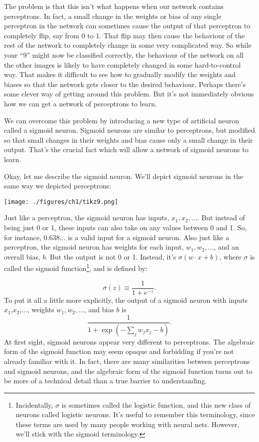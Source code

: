 \documentclass[a4paper,twoside,10pt]{book}
\begin{document}
The problem is that this isn't what happens when our network contains perceptrons. In fact, a small change in the weights or bias of any single perceptron in the network can sometimes cause the output of that perceptron to completely flip, say from 0 to 1. That flip may then cause the behaviour of the rest of the network to completely change in some very complicated way. So while your ``9'' might now be classified correctly, the behaviour of the network on all the other images is likely to have completely changed in some hard-to-control way. That makes it difficult to see how to gradually modify the weights and biases so that the network gets closer to the desired behaviour. Perhaps there's some clever way of getting around this problem. But it's not immediately obvious how we can get a network of perceptrons to learn.

We can overcome this problem by introducing a new type of artificial neuron called a sigmoid neuron. Sigmoid neurons are similar to perceptrons, but modified so that small changes in their weights and bias cause only a small change in their output. That's the crucial fact which will allow a network of sigmoid neurons to learn.

Okay, let me describe the sigmoid neuron. We'll depict sigmoid neurons in the same way we depicted perceptrons:
\begin{center}
	\texttt{[image: ./figures/ch1/tikz9.png]}
\end{center}	
Just like a perceptron, the sigmoid neuron has inputs, $x_1, x_2, \ldots$. But instead of being just 0 or 1, these inputs can also take on any values between 0 and 1. So, for instance, $0.638\ldots$ is a valid input for a sigmoid neuron. Also just like a perceptron, the sigmoid neuron has weights for each input, $w_1,w_2,\ldots$, and an overall bias, $b$. But the output is not 0 or 1. Instead, it's $\sigma(w  \cdot x+b)$, where $\sigma$ is called the sigmoid function\footnote{Incidentally, $\sigma$ is sometimes called the logistic function, and this new class of neurons called logistic neurons. It's useful to remember this terminology, since these terms are used by many people working with neural nets. However, we'll stick with the sigmoid terminology.}, and is defined by:

\begin{equation}
\sigma(z) \equiv \frac1{1+e^{-z}}.\tag{3}\label{eq:sigma}
\end{equation}
To put it all a little more explicitly, the output of a sigmoid neuron with inputs $x_1$,$x_2$,$\ldots$, weights $w_1,w_2,\ldots$, and bias $b$ is
\begin{equation}
\frac1{1+\exp\left(-\sum_jw_jx_j-b\right)}.\tag{4}\label{eq:4}
\end{equation}
At first sight, sigmoid neurons appear very different to perceptrons. The algebraic form of the sigmoid function may seem opaque and forbidding if you're not already familiar with it. In fact, there are many similarities between perceptrons and sigmoid neurons, and the algebraic form of the sigmoid function turns out to be more of a technical detail than a true barrier to understanding.
\end{document}
